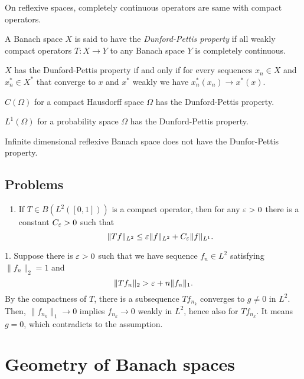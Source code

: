 \documentclass{../../large}
\begin{document}
\begin{prb}
On reflexive spaces, completely continuous operators are same with compact operators.
\end{prb}


\begin{prb}
A Banach space $X$ is said to have the \emph{Dunford-Pettis property} if all weakly compact operators $T:X\to Y$ to any Banach space $Y$ is completely continuous.
\begin{parts}
\item $X$ has the Dunford-Pettis property if and only if for every sequences $x_n\in X$ and $x^*_n\in X^*$ that converge to $x$ and $x^*$ weakly we have $x^*_n(x_n)\to x^*(x)$.
\item $C(\Omega)$ for a compact Hausdorff space $\Omega$ has the Dunford-Pettis property.
\item $L^1(\Omega)$ for a probability space $\Omega$ has the Dunford-Pettis property.
\item Infinite dimensional reflexive Banach space does not have the Dunfor-Pettis property.
\end{parts}
\end{prb}




\section*{Problems}
\begin{enumerate}
\item If $T\in B(L^2([0,1]))$ is a compact operator, then for any $\varepsilon>0$ there is a constant $C_\varepsilon>0$ such that
\[\|Tf\|_{L^2}\le\varepsilon\|f\|_{L^2}+C_\varepsilon\|f\|_{L^1}.\]
\end{enumerate}

\begin{pf}
1. Suppose there is $\varepsilon>0$ such that we have sequence $f_n\in L^2$ satisfying $\|f_n\|_2=1$ and
\[\|Tf_n\|_2>\varepsilon+n\|f_n\|_1.\]
By the compactness of $T$, there is a subsequence $Tf_{n_k}$ converges to $g\ne0$ in $L^2$.
Then, $\|f_{n_k}\|_1\to0$ implies $f_{n_k}\to0$ weakly in $L^2$, hence also for $Tf_{n_k}$.
It means $g=0$, which contradicts to the assumption.
\end{pf}




\chapter{Geometry of Banach spaces}
\end{document}
